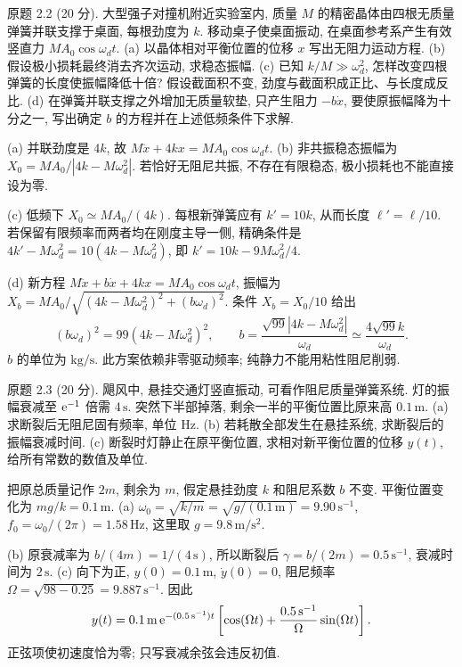 \begin{exercise}\label{ps:2.2}
原题 2.2 (20 分). 大型强子对撞机附近实验室内, 质量 $M$ 的精密晶体由四根无质量弹簧并联支撑于桌面, 每根劲度为 $k$. 移动桌子使桌面振动, 在桌面参考系产生有效竖直力 $MA_0\cos\omega_dt$. (a) 以晶体相对平衡位置的位移 $x$ 写出无阻力运动方程. (b) 假设极小损耗最终消去齐次运动, 求稳态振幅. (c) 已知 $k/M\gg\omega_d^2$, 怎样改变四根弹簧的长度使振幅降低十倍? 假设截面积不变, 劲度与截面积成正比、与长度成反比. (d) 在弹簧并联支撑之外增加无质量软垫, 只产生阻力 $-b\dot x$, 要使原振幅降为十分之一, 写出确定 $b$ 的方程并在上述低频条件下求解.
\end{exercise}
\begin{solution}
(a) 并联劲度是 $4k$, 故 $M\ddot x+4kx=MA_0\cos\omega_dt$. (b) 非共振稳态振幅为 $X_0=MA_0/|4k-M\omega_d^2|$. 若恰好无阻尼共振, 不存在有限稳态, 极小损耗也不能直接设为零.

(c) 低频下 $X_0\simeq MA_0/(4k)$. 每根新弹簧应有 $k'=10k$, 从而长度 $\ell'=\ell/10$. 若保留有限频率而两者均在刚度主导一侧, 精确条件是 $4k'-M\omega_d^2=10(4k-M\omega_d^2)$, 即 $k'=10k-9M\omega_d^2/4$.

(d) 新方程 $M\ddot x+b\dot x+4kx=MA_0\cos\omega_dt$, 振幅为 $X_b=MA_0/\sqrt{(4k-M\omega_d^2)^2+(b\omega_d)^2}$. 条件 $X_b=X_0/10$ 给出
\[
(b\omega_d)^2=99(4k-M\omega_d^2)^2,\qquad
b=\frac{\sqrt{99}|4k-M\omega_d^2|}{\omega_d}\simeq\frac{4\sqrt{99}k}{\omega_d}.
\]
$b$ 的单位为 $\mathrm{kg/s}$. 此方案依赖非零驱动频率; 纯静力不能用粘性阻尼削弱.
\end{solution}
\begin{exercise}\label{ps:2.3}
原题 2.3 (20 分). 飓风中, 悬挂交通灯竖直振动, 可看作阻尼质量弹簧系统. 灯的振幅衰减至 $\mathrm e^{-1}$ 倍需 $4\,\mathrm s$. 突然下半部掉落, 剩余一半的平衡位置比原来高 $0.1\,\mathrm m$. (a) 求断裂后无阻尼固有频率, 单位 Hz. (b) 若耗散全部发生在悬挂系统, 求断裂后的振幅衰减时间. (c) 断裂时灯静止在原平衡位置, 求相对新平衡位置的位移 $y(t)$, 给所有常数的数值及单位.
\end{exercise}
\begin{solution}
把原总质量记作 $2m$, 剩余为 $m$, 假定悬挂劲度 $k$ 和阻尼系数 $b$ 不变. 平衡位置变化为 $mg/k=0.1\,\mathrm m$. (a) $\omega_0=\sqrt{k/m}=\sqrt{g/(0.1\,\mathrm m)}=9.90\,\mathrm{s}^{-1}$, $f_0=\omega_0/(2\pi)=1.58\,\mathrm{Hz}$, 这里取 $g=9.8\,\mathrm{m/s^2}$.

(b) 原衰减率为 $b/(4m)=1/(4\,\mathrm s)$, 所以断裂后 $\gamma=b/(2m)=0.5\,\mathrm{s}^{-1}$, 衰减时间为 $2\,\mathrm s$. (c) 向下为正, $y(0)=0.1\,\mathrm m$, $\dot y(0)=0$, 阻尼频率 $\Omega=\sqrt{98-0.25}=9.887\,\mathrm{s}^{-1}$. 因此
\[
y(t)=0.1\,\mathrm m\,\mathrm e^{-(0.5\,\mathrm{s}^{-1})t}\left[\cos(\Omega t)+\frac{0.5\,\mathrm{s}^{-1}}\Omega\sin(\Omega t)\right].
\]
正弦项使初速度恰为零; 只写衰减余弦会违反初值.
\end{solution}
